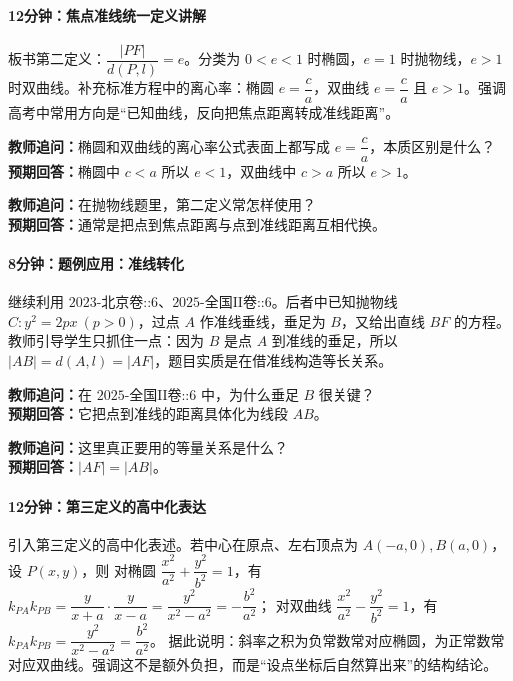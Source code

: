 \documentclass[UTF8,a4paper,11pt]{ctexart}
\begin{document}
\paragraph{12分钟：焦点准线统一定义讲解}

板书第二定义：$\dfrac{|PF|}{d(P,l)}=e$。分类为 $0<e<1$ 时椭圆，$e=1$ 时抛物线，$e>1$ 时双曲线。补充标准方程中的离心率：椭圆 $e=\dfrac{c}{a}$，双曲线 $e=\dfrac{c}{a}$ 且 $e>1$。强调高考中常用方向是“已知曲线，反向把焦点距离转成准线距离”。

\noindent\textbf{教师追问：}椭圆和双曲线的离心率公式表面上都写成 $e=\dfrac{c}{a}$，本质区别是什么？\\

\textbf{预期回答：}椭圆中 $c<a$ 所以 $e<1$，双曲线中 $c>a$ 所以 $e>1$。\par

\noindent\textbf{教师追问：}在抛物线题里，第二定义常怎样使用？\\

\textbf{预期回答：}通常是把点到焦点距离与点到准线距离互相代换。\par

\paragraph{8分钟：题例应用：准线转化}

继续利用 $\text{2023-北京卷::6}$、$\text{2025-全国II卷::6}$。后者中已知抛物线 $C:y^2=2px\ (p>0)$，过点 $A$ 作准线垂线，垂足为 $B$，又给出直线 $BF$ 的方程。教师引导学生只抓住一点：因为 $B$ 是点 $A$ 到准线的垂足，所以 $|AB|=d(A,l)=|AF|$，题目实质是在借准线构造等长关系。

\noindent\textbf{教师追问：}在 $\text{2025-全国II卷::6}$ 中，为什么垂足 $B$ 很关键？\\

\textbf{预期回答：}它把点到准线的距离具体化为线段 $AB$。\par

\noindent\textbf{教师追问：}这里真正要用的等量关系是什么？\\

\textbf{预期回答：}$|AF|=|AB|$。\par

\paragraph{12分钟：第三定义的高中化表达}

引入第三定义的高中化表述。若中心在原点、左右顶点为 $A(-a,0),B(a,0)$，设 $P(x,y)$，则
对椭圆 $\dfrac{x^2}{a^2}+\dfrac{y^2}{b^2}=1$，有
$k_{PA}k_{PB}=\dfrac{y}{x+a}\cdot\dfrac{y}{x-a}=\dfrac{y^2}{x^2-a^2}=-\dfrac{b^2}{a^2}$；
对双曲线 $\dfrac{x^2}{a^2}-\dfrac{y^2}{b^2}=1$，有
$k_{PA}k_{PB}=\dfrac{y^2}{x^2-a^2}=\dfrac{b^2}{a^2}$。
据此说明：斜率之积为负常数常对应椭圆，为正常数常对应双曲线。强调这不是额外负担，而是“设点坐标后自然算出来”的结构结论。
\end{document}
